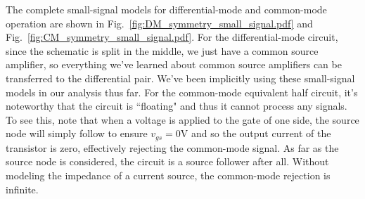 The complete small-signal models for differential-mode and common-mode operation are shown in Fig.~\ref{fig:DM_symmetry_small_signal.pdf} and Fig.~\ref{fig:CM_symmetry_small_signal.pdf}.  For the differential-mode circuit, since the schematic is split in the middle, we just have a common source amplifier, so everything we've learned about common source amplifiers can be transferred to the differential pair.  We've been implicitly using these small-signal models in our analysis thus far.  For the common-mode equivalent half circuit, it's noteworthy that the circuit is ``floating" and thus it cannot process any signals.  To see this, note that when a voltage is applied to the gate of one side, the source node will simply follow to ensure $v_{gs} = 0$V and so the output current of the transistor is zero, effectively rejecting the common-mode signal.  As far as the source node is considered, the circuit is a source follower after all.  Without modeling the impedance of a current source, the common-mode rejection is infinite.
